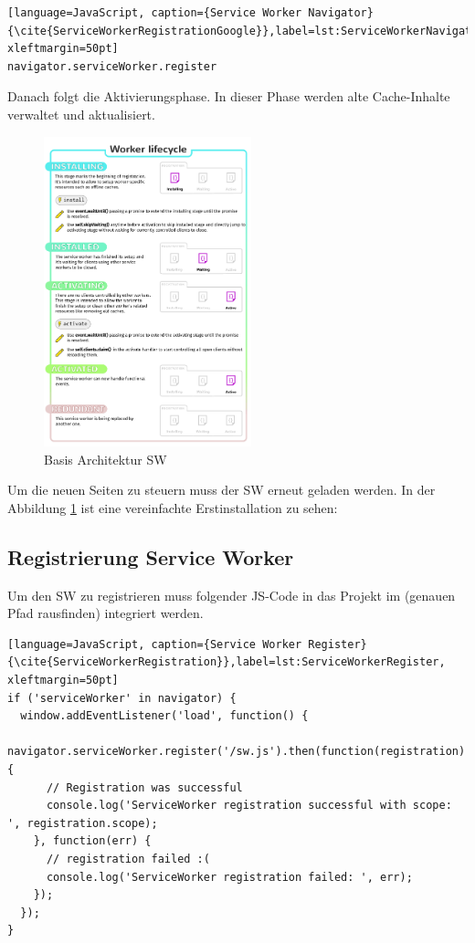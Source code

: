 \begin{lstlisting}[language=JavaScript, caption={Service Worker Navigator} {\cite{ServiceWorkerRegistrationGoogle}},label=lst:ServiceWorkerNavigator, xleftmargin=50pt]
navigator.serviceWorker.register
\end{lstlisting}

Danach folgt die Aktivierungsphase. In dieser Phase werden alte Cache-Inhalte verwaltet und aktualisiert.


\begin{figure}[h]
	\centering
	\includegraphics[width=6cm]{BilderAllgemein/swLifecycle}\medskip
	\caption{Basis Architektur \acl{SW} \cite{ServiceWorkerArchitecture}}
	\label{fig:Erstinstallation}
\end{figure}


Um die neuen Seiten zu steuern muss der \acs{SW} erneut geladen werden.
In der Abbildung \ref{fig:Erstinstallation} ist eine vereinfachte Erstinstallation zu sehen:

\newpage
\subsection{Registrierung Service Worker}\label{chap:RegistrierungServiceWorker}

Um den \acs{SW} zu registrieren muss folgender \acs{JS}-Code in das Projekt im (genauen Pfad rausfinden) integriert werden.
\begin{lstlisting}[language=JavaScript, caption={Service Worker Register} {\cite{ServiceWorkerRegistration}},label=lst:ServiceWorkerRegister, xleftmargin=50pt]
if ('serviceWorker' in navigator) {
  window.addEventListener('load', function() {
    navigator.serviceWorker.register('/sw.js').then(function(registration) {
      // Registration was successful
      console.log('ServiceWorker registration successful with scope: ', registration.scope);
    }, function(err) {
      // registration failed :(
      console.log('ServiceWorker registration failed: ', err);
    });
  });
}
\end{lstlisting}


